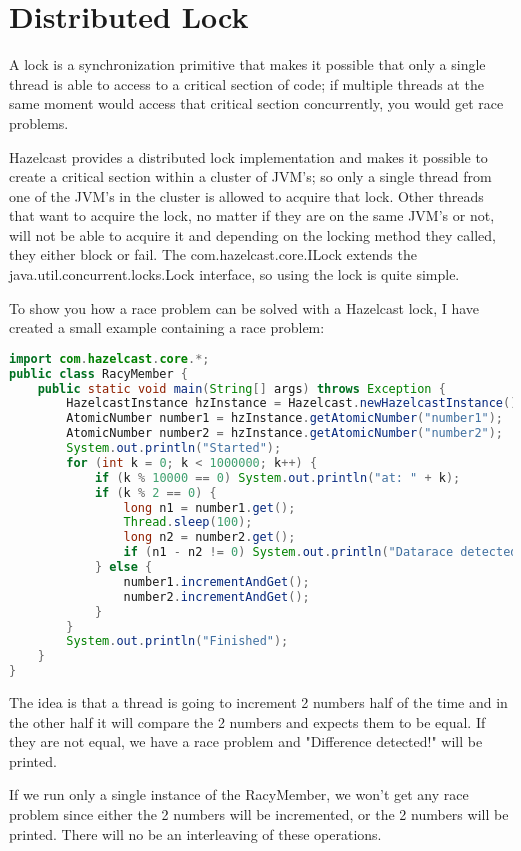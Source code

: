 \section{Distributed Lock}
A lock is a synchronization primitive that makes it possible that only a single thread is able to access to a critical section of code; if multiple threads at the same moment would access that critical section concurrently, you would get race problems. 

Hazelcast provides a distributed lock implementation and makes it possible to create a critical section within a cluster of JVM's; so only a single thread from one of the JVM's in the cluster is allowed to acquire that lock. Other threads that want to acquire the lock, no matter if they are on the same JVM's or not, will not be able to acquire it and depending on the locking method they called, they either block or fail. The com.hazelcast.core.ILock extends the java.util.concurrent.locks.Lock interface, so using the lock is quite simple.

To show you how a race problem can be solved with a Hazelcast lock, I have created a small example containing a race problem:
\begin{lstlisting}[language=java]
import com.hazelcast.core.*;
public class RacyMember {
    public static void main(String[] args) throws Exception {
        HazelcastInstance hzInstance = Hazelcast.newHazelcastInstance();
        AtomicNumber number1 = hzInstance.getAtomicNumber("number1");
        AtomicNumber number2 = hzInstance.getAtomicNumber("number2");
        System.out.println("Started");
        for (int k = 0; k < 1000000; k++) {
            if (k % 10000 == 0) System.out.println("at: " + k);
            if (k % 2 == 0) {
                long n1 = number1.get();
                Thread.sleep(100);
                long n2 = number2.get();
                if (n1 - n2 != 0) System.out.println("Datarace detected!");
            } else {
                number1.incrementAndGet();
                number2.incrementAndGet();
            }
        }
        System.out.println("Finished");
    }
}
\end{lstlisting}
The idea is that a thread is going to increment 2 numbers half of the time and in the other half it will compare the 2 numbers and expects them to be equal. If they are not equal, we have a race problem and "Difference detected!" will be printed.

If we run only a single instance of the RacyMember, we won't get any race problem since either the 2 numbers will be incremented, or the 2 numbers will be printed. There will no be an interleaving of these operations.

